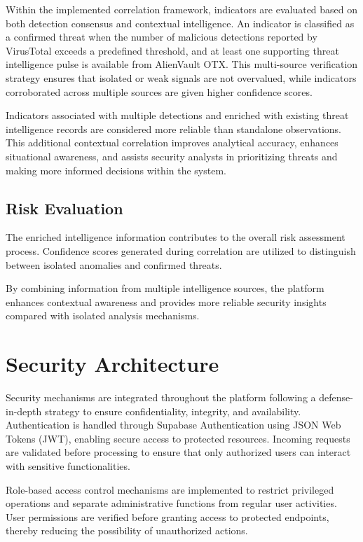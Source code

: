 Within the implemented correlation framework, indicators are evaluated based on both detection consensus and contextual intelligence. An indicator is classified as a confirmed threat when the number of malicious detections reported by VirusTotal exceeds a predefined threshold, and at least one supporting threat intelligence pulse is available from AlienVault OTX. This multi-source verification strategy ensures that isolated or weak signals are not overvalued, while indicators corroborated across multiple sources are given higher confidence scores.

Indicators associated with multiple detections and enriched with existing threat intelligence records are considered more reliable than standalone observations. This additional contextual correlation improves analytical accuracy, enhances situational awareness, and assists security analysts in prioritizing threats and making more informed decisions within the system.

\subsection{Risk Evaluation}
The enriched intelligence information contributes to the overall risk assessment process. Confidence scores generated during correlation are utilized to distinguish between isolated anomalies and confirmed threats.

By combining information from multiple intelligence sources, the platform enhances contextual awareness and provides more reliable security insights compared with isolated analysis mechanisms.

\section{Security Architecture}
Security mechanisms are integrated throughout the platform following a defense-in-depth strategy to ensure confidentiality, integrity, and availability. Authentication is handled through Supabase Authentication using JSON Web Tokens (JWT), enabling secure access to protected resources. Incoming requests are validated before processing to ensure that only authorized users can interact with sensitive functionalities.

Role-based access control mechanisms are implemented to restrict privileged operations and separate administrative functions from regular user activities. User permissions are verified before granting access to protected endpoints, thereby reducing the possibility of unauthorized actions.

